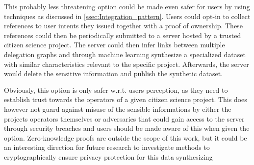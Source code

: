 This probably less threatening option could be made even safer for users by using techniques as discussed in \autoref{ssec:Integration_pattern}.
Users could opt-in to collect references to user intents they issued together with a proof of ownership.
These references could then be periodically submitted to a server hosted by a trusted citizen science project.
The server could then infer links between multiple delegation graphs and through machine learning synthesize a specialized dataset with similar characteristics relevant to the specific project.
Afterwards, the server would delete the sensitive information and publish the synthetic dataset.

Obviously, this option is only safer w.r.t. users perception, as they need to establish trust towards the operators of a given citizen science project.
This does however not guard against misuse of the sensible informations by either the projects operators themselves or adversaries that could gain access to the server through security breaches and users should be made aware of this when given the option.
Zero-knowledge proofs are outside the scope of this work, but it could be an interesting direction for future research to investigate methods to  cryptographically ensure privacy protection for this data synthesizing 


